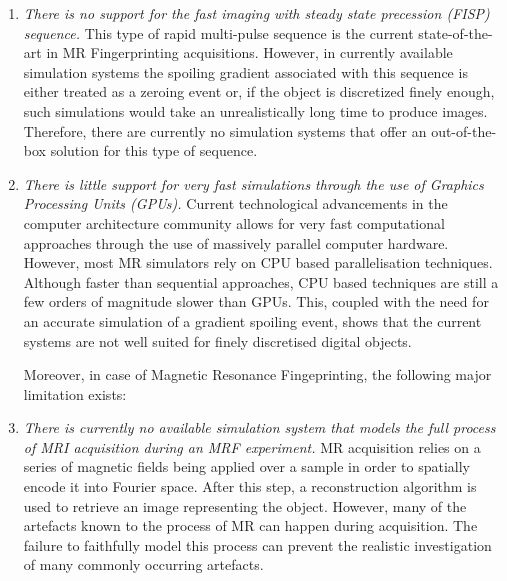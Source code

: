 \begin{enumerate}
    \item \textit{There is no support for the fast imaging with steady state precession (FISP) sequence.}
    This type of rapid multi-pulse sequence is the current state-of-the-art in MR Fingerprinting acquisitions.
    However, in currently available simulation systems the spoiling gradient associated with this sequence is either treated as a zeroing event or, if the object is discretized finely enough, such simulations would take an unrealistically long time to produce images.
    Therefore, there are currently no simulation systems that offer an out-of-the-box solution for this type of sequence.
    
    
    \item \textit{There is little support for very fast simulations through the use of Graphics Processing Units (GPUs).}
    Current technological advancements in the computer architecture community allows for very fast computational approaches through the use of massively parallel computer hardware.
    However, most MR simulators rely on CPU based parallelisation techniques.
    Although faster than sequential approaches, CPU based techniques are still a few orders of magnitude slower than GPUs.
    This, coupled with the need for an accurate simulation of a gradient spoiling event, shows that the current systems are not well suited for finely discretised digital objects. \\

    \hfill

	Moreover, in case of Magnetic Resonance Fingeprinting, the following major limitation exists: \\

    \item \textit{There is currently no available simulation system that models the full process of MRI acquisition during an MRF experiment.}
    MR acquisition relies on a series of magnetic fields being applied over a sample in order to spatially encode it into Fourier space.
    After this step, a reconstruction algorithm is used to retrieve an image representing the object.
    However, many of the artefacts known to the process of MR can happen during acquisition.
    The failure to faithfully model this process can prevent the realistic investigation of many commonly occurring artefacts.
\end{enumerate}

